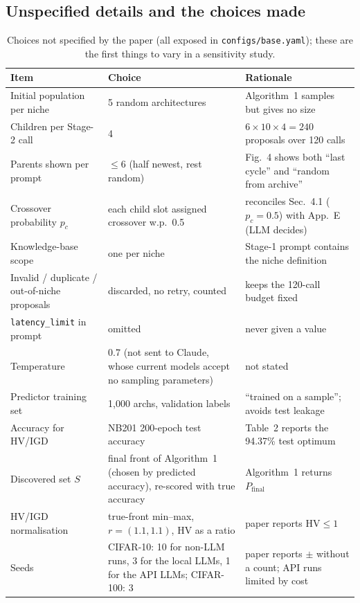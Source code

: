 \documentclass[pdflatex,sn-mathphys-ay]{sn-jnl}
\newcommand{\code}[1]{\texttt{#1}}
\newcommand{\HV}{\mathrm{HV}}
\begin{document}
\subsection{Unspecified details and the choices made}\label{sec:assumed}
\begin{table}[h]\centering\footnotesize\setlength{\tabcolsep}{3pt}
\caption{Choices not specified by the paper (all exposed in \code{configs/base.yaml}); these are the first things to vary in a sensitivity study.}\label{tab:assumed}
\begin{tabular}{p{3.6cm}p{3.1cm}p{4.8cm}}
\toprule
Item & Choice & Rationale \\
\midrule
Initial population per niche & 5 random architectures & Algorithm~1 samples but gives no size \\
Children per Stage-2 call & 4 & $6\times10\times4=240$ proposals over 120 calls \\
Parents shown per prompt & $\le6$ (half newest, rest random) & Fig.~4 shows both ``last cycle'' and ``random from archive'' \\
Crossover probability $p_c$ & each child slot assigned crossover w.p.\ 0.5 & reconciles Sec.~4.1 ($p_c{=}0.5$) with App.~E (LLM decides) \\
Knowledge-base scope & one per niche & Stage-1 prompt contains the niche definition \\
Invalid / duplicate / out-of-niche proposals & discarded, no retry, counted & keeps the 120-call budget fixed \\
\code{latency\_limit} in prompt & omitted & never given a value \\
Temperature & 0.7 (not sent to Claude, whose current models accept no sampling parameters) & not stated \\
Predictor training set & 1{,}000 archs, validation labels & ``trained on a sample''; avoids test leakage \\
Accuracy for HV/IGD & NB201 200-epoch test accuracy & Table~2 reports the 94.37\% test optimum \\
Discovered set $S$ & final front of Algorithm~1 (chosen by predicted accuracy), re-scored with true accuracy & Algorithm~1 returns $P_{\text{final}}$ \\
HV/IGD normalisation & true-front min--max, $r=(1.1,1.1)$, HV as a ratio & paper reports $\HV\le1$ \\
Seeds & CIFAR-10: 10 for non-LLM runs, 3 for the local LLMs, 1 for the API LLMs; CIFAR-100: 3 & paper reports $\pm$ without a count; API runs limited by cost \\
\bottomrule
\end{tabular}
\end{table}
\end{document}

